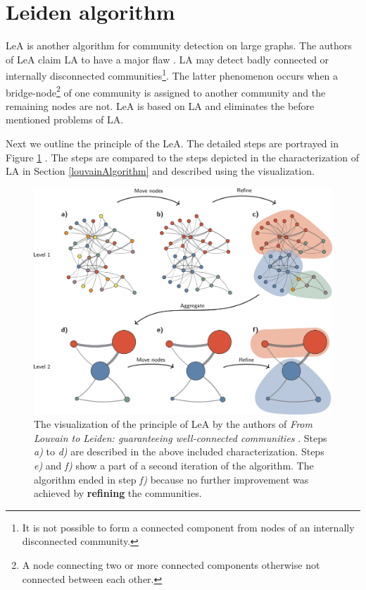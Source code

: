 \section{Leiden algorithm} \label{leidenAlgorithm}
 LeA is another algorithm for community detection on large graphs. The authors of LeA claim LA to have a major flaw \cite{leidenAlgorithm}. LA may detect badly connected or internally disconnected communities\footnote{It is not possible to form a connected component from nodes of an internally disconnected community.}. The latter phenomenon occurs when a bridge-node\footnote{A node connecting two or more connected components otherwise not connected between each other.} of one community is assigned to another community and the remaining nodes are not. LeA is based on LA and eliminates the before mentioned problems of LA. 

Next we outline the principle of the LeA. The detailed steps are portrayed in Figure \ref{leidenVisualization} \cite{leidenVisualization}. The steps are compared to the steps depicted in the characterization of LA in Section \ref{louvainAlgorithm} and described using the visualization.
\begin{figure}[ht!]
  \centering
  \includegraphics[width=\textwidth]{Images/leidenVisualization.png}
  \caption{The visualization of the principle of LeA \cite{leidenVisualization} by the authors of \textit{From Louvain to Leiden: guaranteeing well-connected communities} \cite{leidenAlgorithm}. Steps \textit{a)} to \textit{d)} are described in the above included characterization. Steps \textit{e)} and \textit{f)} show a part of a second iteration of the algorithm. The algorithm ended in step \textit{f)} because no further improvement was achieved by \textbf{refining} the communities.}
  \label{leidenVisualization}
\end{figure}    
 
